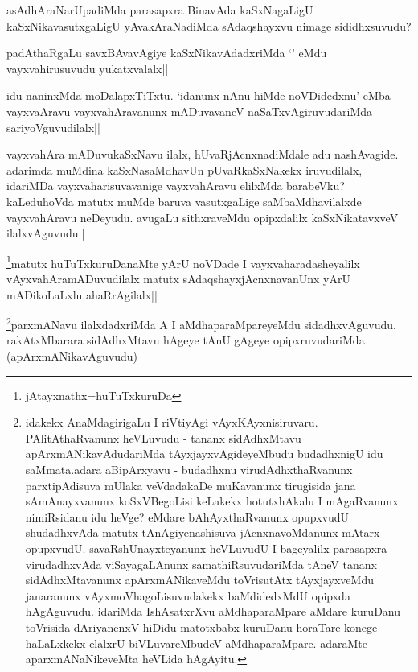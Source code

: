 \begin{artha}
asAdhAraNarUpadiMda parasapxra BinavAda kaSxNagaLigU kaSxNikavasutxgaLigU yAvakAraNadiMda sAdaqshayxvu nimage sididhxsuvudu? 
\end{artha}


\begin{artha}
padAthaRgaLu savxBAvavAgiye kaSxNikavAdadxriMda `\stext' eMdu vayxvahirusuvudu yukatxvalalx||
\end{artha}

\begin{artha}
idu naninxMda moDalapxTiTxtu. `idanunx nAnu hiMde noVDidedxnu' eMba vayxvaAravu vayxvahAravanunx mADuvavaneV naSaTxvAgiruvudariMda sariyoVguvudilalx||
\end{artha}

\begin{artha}
vayxvahAra mADuvukaSxNavu ilalx, hUvaRjAcnxnadiMdale adu nashAvagide. adarimda muMdina kaSxNasaMdhavUn pUvaRkaSxNakekx iruvudilalx, idariMDa vayxvaharisuvavanige vayxvahAravu elilxMda barabeVku? kaLeduhoVda matutx muMde baruva vasutxgaLige saMbaMdhavilalxde vayxvahAravu neDeyudu. avugaLu sithxraveMdu opipxdalilx kaSxNikatavxveV ilalxvAguvudu||
\end{artha}
\begin{artha}
\footnote{jAtayxnathx=huTuTxkuruDa}matutx huTuTxkuruDanaMte yArU noVDade I vayxvaharadasheyalilx vAyxvahAramADuvudilalx matutx sAdaqshayxjAcnxnavanUnx yArU mADikoLaLxlu ahaRrAgilalx||
\end{artha}

\begin{artha}
\footnote{idakekx AnaMdagirigaLu I riVtiyAgi vAyxKAyxnisiruvaru. PAlitAthaRvanunx heVLuvudu - tananx sidAdhxMtavu apArxmANikavAdudariMda tAyxjayxvAgideyeMbudu budadhxnigU idu saMmata.adara aBipArxyavu - budadhxnu virudAdhxthaRvanunx parxtipAdisuva mUlaka veVdadakaDe muKavanunx tirugisida jana sAmAnayxvanunx koSxVBegoLisi keLakekx hotutxhAkalu I mAgaRvanunx nimiRsidanu idu heVge? eMdare bAhAyxthaRvanunx opupxvudU shudadhxvAda matutx tAnAgiyenashisuva jAcnxnavoMdanunx mAtarx opupxvudU. savaRshUnayxteyanunx heVLuvudU I bageyalilx parasapxra virudadhxvAda viSayagaLAnunx samathiRsuvudariMda tAneV tananx sidAdhxMtavanunx apArxmANikaveMdu toVrisutAtx tAyxjayxveMdu janaranunx vAyxmoVhagoLisuvudakekx baMdidedxMdU opipxda hAgAguvudu. idariMda IshAsatxrXvu aMdhaparaMpare aMdare kuruDanu toVrisida dAriyanenxV hiDidu matotxbabx kuruDanu horaTare konege haLaLxkekx elalxrU biVLuvareMbudeV aMdhaparaMpare. adaraMte aparxmANaNikeveMta heVLida hAgAyitu.}parxmANavu ilalxdadxriMda A I  aMdhaparaMpareyeMdu sidadhxvAguvudu. rakAtxMbarara sidAdhxMtavu hAgeye tAnU gAgeye opipxruvudariMda (apArxmANikavAguvudu)
\end{artha}

